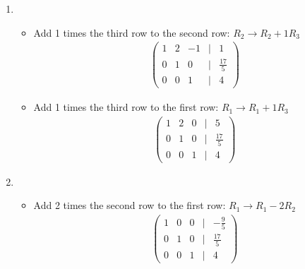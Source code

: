 \documentclass[letterpaper,10pt,english]{jupyterBook}
\begin{document}
\begin{enumerate}
\item {} 
\sphinxAtStartPar
{}
\begin{itemize}
\item {} 
\sphinxAtStartPar
Add 1 times the third row to the second row:
\(R_2 \rightarrow R_2 + 1R_3\)
\begin{equation*}
\begin{split}\begin{pmatrix}
     1 & 2 & -1 & \vert & 1 \\
     0 & 1 & 0 & \vert & \frac{17}{5} \\
     0 & 0 & 1 & \vert & 4
     \end{pmatrix}
     \end{split}
\end{equation*}
\item {} 
\sphinxAtStartPar
Add 1 times the third row to the first row:
\(R_1 \rightarrow R_1 + 1R_3\)
\begin{equation*}
\begin{split}\begin{pmatrix}
     1 & 2 & 0 & \vert & 5 \\
     0 & 1 & 0 & \vert & \frac{17}{5} \\
     0 & 0 & 1 & \vert & 4
     \end{pmatrix}
     \end{split}
\end{equation*}
\end{itemize}

\item {} 
\sphinxAtStartPar
{}
\begin{itemize}
\item {} 
\sphinxAtStartPar
Add \sphinxhyphen{}2 times the second row to the first row:
\(R_1 \rightarrow R_1 - 2R_2\)
\begin{equation*}
\begin{split}
     \begin{pmatrix}
     1 & 0 & 0 & \vert & -\frac{9}{5} \\
     0 & 1 & 0 & \vert & \frac{17}{5} \\
     0 & 0 & 1 & \vert & 4
     \end{pmatrix}
     \end{split}
\end{equation*}
\end{itemize}

\end{enumerate}
\end{document}
